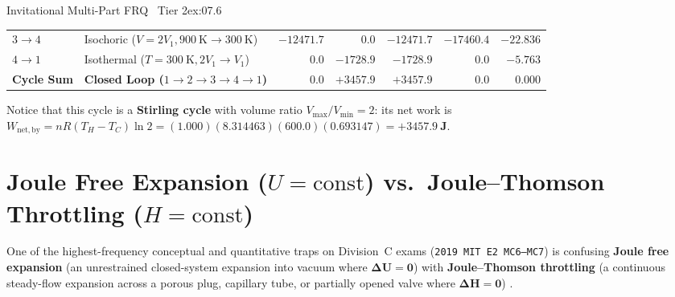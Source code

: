 \begin{workedexample}{Invitational Multi-Part FRQ \textbar\ Tier 2}{ex:07.6}
\begin{tabularx}{\linewidth}{@{}l l r r r r r@{}}
$3\to 4$ & Isochoric ($V=2V_1, \SI{900}{\kelvin}\to\SI{300}{\kelvin}$) & $-12471.7$ & $0.0$ & $-12471.7$ & $-17460.4$ & $-22.836$ \\
$4\to 1$ & Isothermal ($T=\SI{300}{\kelvin}, 2V_1\to V_1$) & $0.0$ & $-1728.9$ & $-1728.9$ & $0.0$ & $-5.763$ \\
\midrule
\textbf{Cycle Sum} & \textbf{Closed Loop ($1\to 2\to 3\to 4\to 1$)} & $\mathbf{0.0}$ & $\mathbf{+3457.9}$ & $\mathbf{+3457.9}$ & $\mathbf{0.0}$ & $\mathbf{0.000}$ \\
\bottomrule
\end{tabularx}
\par\smallskip\noindent
Notice that this cycle is a \textbf{Stirling cycle} with volume ratio $V_{\max}/V_{\min} = 2$: its net work is $W_{\mathrm{net,by}} = nR(T_H - T_C)\ln 2 = (1.000)(8.314463)(600.0)(0.693147) = \mathbf{+\SI{3457.9}{\joule}}$.
\end{workedexample}

\section{Joule Free Expansion ($U = \mathrm{const}$) vs.\ Joule--Thomson Throttling ($H = \mathrm{const}$)}\label{sec:07.6}

One of the highest-frequency conceptual and quantitative traps on Division~C exams (\texttt{2019 MIT E2 MC6--MC7}) is confusing \textbf{Joule free expansion} (an unrestrained closed-system expansion into vacuum where $\mathbf{\Delta U = 0}$) with \textbf{Joule--Thomson throttling} (a continuous steady-flow expansion across a porous plug, capillary tube, or partially opened valve where $\mathbf{\Delta H = 0}$) .

